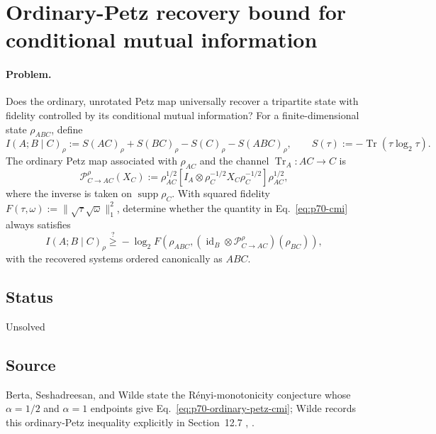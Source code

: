 \section{Ordinary-Petz recovery bound for conditional mutual information}
\label{sec:problem-70}

\paragraph{Problem.}
Does the ordinary, unrotated Petz map universally recover a tripartite state
with fidelity controlled by its conditional mutual information?  For a
finite-dimensional state $\rho_{ABC}$, define
\begin{equation}
  I(A;B\mid C)_\rho
  :=S(AC)_\rho+S(BC)_\rho-S(C)_\rho-S(ABC)_\rho,
  \qquad
  S(\tau):=-\operatorname{Tr}(\tau\log_2\tau).
  \label{eq:p70-cmi}
\end{equation}
The ordinary Petz map associated with $\rho_{AC}$ and the channel
$\operatorname{Tr}_A:AC\to C$ is
\begin{equation}
  \mathcal P^{\rho}_{C\to AC}(X_C)
  :=\rho_{AC}^{1/2}\!\left[
      I_A\otimes\rho_C^{-1/2}X_C\rho_C^{-1/2}
    \right]\rho_{AC}^{1/2},
  \label{eq:p70-petz-map}
\end{equation}
where the inverse is taken on $\operatorname{supp}\rho_C$.  With squared
fidelity $F(\tau,\omega):=\lVert\sqrt\tau\sqrt\omega\rVert_1^2$, determine
whether the quantity in Eq.~\eqref{eq:p70-cmi} always satisfies
\begin{equation}
  I(A;B\mid C)_\rho
  \stackrel{?}{\geq}
  -\log_2 F\!\left(
    \rho_{ABC},
    (\operatorname{id}_B\otimes\mathcal P^{\rho}_{C\to AC})(\rho_{BC})
  \right),
  \label{eq:p70-ordinary-petz-cmi}
\end{equation}
with the recovered systems ordered canonically as $ABC$.

\subsection*{Status}

Unsolved

\subsection*{Source}

Berta, Seshadreesan, and Wilde state the R\'enyi-monotonicity conjecture whose
$\alpha=1/2$ and $\alpha=1$ endpoints give
Eq.~\eqref{eq:p70-ordinary-petz-cmi}; Wilde records this ordinary-Petz
inequality explicitly in Section~12.7
,
.

